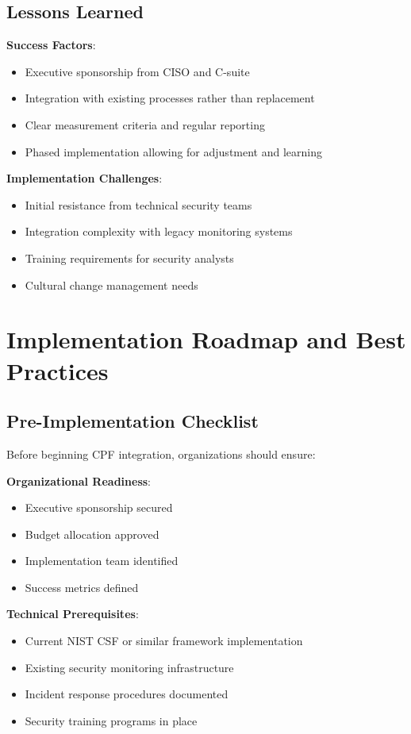 \documentclass[11pt,a4paper]{article}
\begin{document}
\subsection{Lessons Learned}

\textbf{Success Factors}:
\begin{itemize}
\item Executive sponsorship from CISO and C-suite
\item Integration with existing processes rather than replacement
\item Clear measurement criteria and regular reporting
\item Phased implementation allowing for adjustment and learning
\end{itemize}

\textbf{Implementation Challenges}:
\begin{itemize}
\item Initial resistance from technical security teams
\item Integration complexity with legacy monitoring systems
\item Training requirements for security analysts
\item Cultural change management needs
\end{itemize}

\section{Implementation Roadmap and Best Practices}

\subsection{Pre-Implementation Checklist}

Before beginning CPF integration, organizations should ensure:

\textbf{Organizational Readiness}:
\begin{itemize}
\item Executive sponsorship secured
\item Budget allocation approved
\item Implementation team identified
\item Success metrics defined
\end{itemize}

\textbf{Technical Prerequisites}:
\begin{itemize}
\item Current NIST CSF or similar framework implementation
\item Existing security monitoring infrastructure
\item Incident response procedures documented
\item Security training programs in place
\end{itemize}
\end{document}
